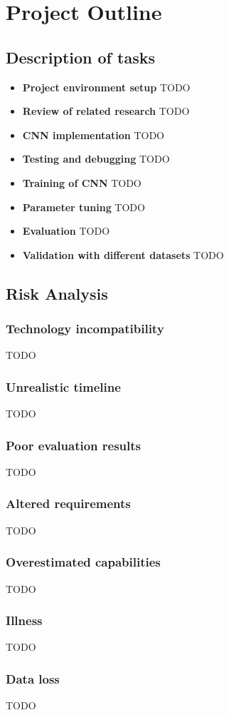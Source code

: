\let\textcircled=\pgftextcircled
\chapter{Project Outline}
\label{chap:proj_outline}

\section{Description of tasks}

\begin{itemize}
    \item \textbf{Project environment setup} TODO
    \item \textbf{Review of related research} TODO 
    \item \textbf{CNN implementation} TODO 
    \item \textbf{Testing and debugging} TODO
    \item \textbf{Training of CNN} TODO 
    \item \textbf{Parameter tuning} TODO 
    \item \textbf{Evaluation} TODO 
    \item \textbf{Validation with different datasets} TODO 
\end{itemize}






\section{Risk Analysis}
 
\subsection*{Technology incompatibility} TODO 

\subsection*{Unrealistic timeline} TODO 
	
	
	
\subsection*{Poor evaluation results} TODO 



\subsection*{Altered requirements} TODO 


\subsection*{Overestimated capabilities} TODO 


\subsection*{Illness} TODO 


\subsection*{Data loss} TODO 








